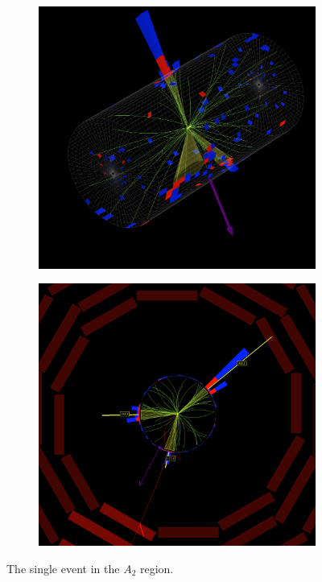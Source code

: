 \begin{figure}[hbp!]
\centering
\begin{subfigure}[b]{0.49\textwidth}
\includegraphics[width=\textwidth]{figs/SUS17006/fireworks_ak8barrel.png}
\end{subfigure}
\begin{subfigure}[b]{0.49\textwidth}
\includegraphics[width=\textwidth]{figs/SUS17006/fireworks_ak8rhophi.png}
\end{subfigure}
\caption{The single event in the $A_{2}$ region.}
\label{fig:fireworks}
\end{figure}

